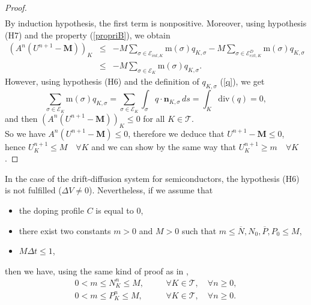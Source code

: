 \documentclass[smallextended]{svjour3}
\begin{document}
\begin{proof}
\begin{eqnarray*}
\end{eqnarray*}
By induction hypothesis, the first term is nonpositive. Moreover, using hypothesis (H7) and the property (\ref{propriB}), we obtain
\begin{eqnarray*}
\left(A^{n}\left(U^{n+1}-\textbf{M}\right)\right)_{K} &\leq &-M \sum_{\sigma \in \mathcal{E}_{int,K}}\text{m}(\sigma)q_{K,\sigma} -M \sum_{\sigma \in \mathcal{E}_{ext,K}^{D}}\text{m}(\sigma)q_{K,\sigma}\\
&\leq & -M \sum_{\sigma \in \mathcal{E}_{K}}\text{m}(\sigma)q_{K,\sigma}.
\end{eqnarray*}
However, using hypothesis (H6) and the definition of $q_{K,\sigma}$ (\ref{q}), we get
\begin{equation*}
\sum_{\sigma \in \mathcal{E}_{K}}\text{m}(\sigma)q_{K,\sigma}=\sum_{\sigma \in \mathcal{E}_{K}}\int_{\sigma}q \cdot \mathbf{n}_{K,\sigma}\, ds= \int_{K}\text{div}(q)=0,
\end{equation*}
and then $\left(A^{n}\left(U^{n+1}-\textbf{M}\right)\right)_{K} \leq 0$ for all $K \in \mathcal{T}$.\\
So we have $A^{n}\left(U^{n+1}-\textbf{M}\right) \leq 0$, therefore we deduce that $U^{n+1}-\textbf{M} \leq 0$, hence $U^{n+1}_{K} \leq M \quad \forall K$ and we can show by the same way that $U^{n+1}_{K} \geq m \quad \forall K$.
\end{proof}

\begin{remark}
In the case of the drift-diffusion system for semiconductors, the hypothesis (H6) is not fulfilled ($ \Delta V \neq 0$). Nevertheless, if we assume that
\begin{itemize}
\item the doping profile $C$ is equal to $0$,
\item there exist two constants $m>0$ and $M>0$ such that $m\leq \overline{N},N_{0},\overline{P},P_{0}\leq M$,
\item $M \Delta t \leq 1$,
\end{itemize}
then we have, using the same kind of proof as in \cite{Chainais-Hillairet2003},
\begin{eqnarray*}
0 <m \leq N^{n}_{K} \leq M, & &\quad \forall K \in \mathcal{T}, \quad \forall n \geq 0,\\
0 <m \leq P^{n}_{K} \leq M, & &\quad \forall K \in \mathcal{T}, \quad \forall n \geq 0.
\end{eqnarray*}
\end{remark}
\end{document}
